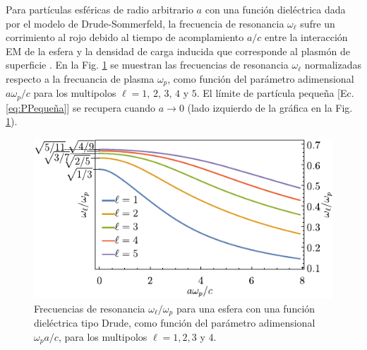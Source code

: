 Para partículas esféricas de radio arbitrario $a$ con una función dieléctrica dada por el modelo de Drude-Sommerfeld, la frecuencia de resonancia $\omega_\ell$ sufre un corrimiento al rojo debido al tiempo de acomplamiento $a/c$ entre la interacción EM de la esfera y  la densidad de carga inducida que corresponde al plasmón de superficie \cite{aizpurua1998coupling}.  En la Fig.  \ref{fig:NormalModes} se muestran las frecuencias de resonancia $\omega_\ell$ normalizadas respecto a la frecuancia de plasma $\omega_p$, como función del parámetro adimensional $a\omega_p / c$ para los multipolos $\ell = 1,\,2,\,3,\,4$ y $5$. El límite de partícula pequeña [Ec.  \eqref{eq:PPequeña}]	se recupera cuando  $a\to 0$ (lado izquierdo de la gráfica en la Fig.  \ref{fig:NormalModes}).  

	\begin{figure}[h!]\centering
		\includegraphics[scale=1]{1-Teoria/figs/1-4-DrudeMultipoles.pdf}\vspace*{-1em}
	\caption{Frecuencias de resonancia $\omega_\ell/\omega_p$ para una esfera con una función dieléctrica tipo Drude, como función del parámetro adimensional  $\omega_p a / c$, para los multipolos $\ell = 1,2,3$ y $4$. }
	\label{fig:NormalModes}
	\end{figure}		






